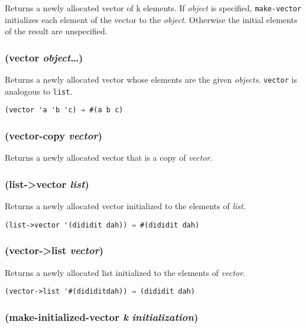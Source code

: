 \documentclass{article}
\begin{document}
Returns a newly allocated vector of k elements. If \emph{object} is specified,
\verb|make-vector| initializes each element of the vector to the \emph{object}. Otherwise
the initial elements of the result are unspecified.

\subsubsection{(vector \emph{object}\ldots{})}

Returns a newly allocated vector whose elements are the given \emph{objects}. \verb|vector|
is analogous to \verb|list|.

\begin{verbatim}
(vector 'a 'b 'c) ⇒ #(a b c)
\end{verbatim}

\subsubsection{(vector-copy \emph{vector})}

Returns a newly allocated vector that is a copy of \emph{vector}.

\subsubsection{(list-\textgreater{}vector \emph{list})}

Returns a newly allocated vector initialized to the elements of \emph{list}.

\begin{verbatim}
(list->vector '(dididit dah)) ⇒ #(dididit dah)
\end{verbatim}

\subsubsection{(vector-\textgreater{}list \emph{vector})}

Returns a newly allocated list initialized to the elements of \emph{vector}.

\begin{verbatim}
(vector->list '#(dididitdah)) ⇒ (dididit dah)
\end{verbatim}

\subsubsection{(make-initialized-vector \emph{k} \emph{initialization})}
\end{document}
